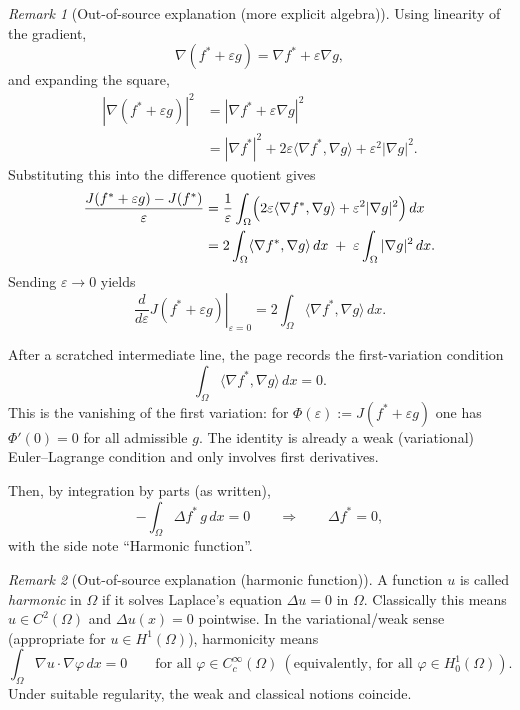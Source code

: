 \documentclass[11pt]{article}
\theoremstyle{definition}
\theoremstyle{remark}
\newtheorem{remark}{Remark}
\begin{document}
\begin{remark}[Out-of-source explanation (more explicit algebra)]
Using linearity of the gradient,
\[
\nabla(f^\ast+\varepsilon g)=\nabla f^\ast+\varepsilon\nabla g,
\]
and expanding the square,
\[
\begin{aligned}
|\nabla(f^\ast+\varepsilon g)|^2
&=|\nabla f^\ast+\varepsilon\nabla g|^2 \\
&=|\nabla f^\ast|^2 + 2\varepsilon\langle \nabla f^\ast,\nabla g\rangle + \varepsilon^2|\nabla g|^2.
\end{aligned}
\]
Substituting this into the difference quotient gives
\[
\begin{aligned}
\frac{J(f^\ast+\varepsilon g)-J(f^\ast)}{\varepsilon}
&=\frac{1}{\varepsilon}\int_\Omega\Bigl(2\varepsilon\langle \nabla f^\ast,\nabla g\rangle + \varepsilon^2|\nabla g|^2\Bigr)\,dx\\
&=2\int_\Omega \langle \nabla f^\ast,\nabla g\rangle\,dx \;+\; \varepsilon\int_\Omega |\nabla g|^2\,dx.
\end{aligned}
\]
Sending $\varepsilon\to 0$ yields
\[
\left.\frac{d}{d\varepsilon}J(f^\ast+\varepsilon g)\right|_{\varepsilon=0}
=2\int_\Omega \langle \nabla f^\ast,\nabla g\rangle\,dx.
\]
\end{remark}

After a scratched intermediate line, the page records the first-variation condition
\[
\int_\Omega \langle \nabla f^\ast,\nabla g\rangle\,dx = 0.
\]
This is the vanishing of the first variation: for $\Phi(\varepsilon):=J(f^\ast+\varepsilon g)$ one has $\Phi'(0)=0$ for all admissible $g$. The identity is already a weak (variational) Euler--Lagrange condition and only involves first derivatives.

Then, by integration by parts (as written),
\[
-\int_\Omega \Delta f^\ast \, g\,dx = 0
\qquad \Rightarrow \qquad
\Delta f^\ast = 0,
\]
with the side note ``Harmonic function''.

\begin{remark}[Out-of-source explanation (harmonic function)]
A function $u$ is called \emph{harmonic} in $\Omega$ if it solves Laplace's equation $\Delta u=0$ in $\Omega$. Classically this means $u\in C^2(\Omega)$ and $\Delta u(x)=0$ pointwise. In the variational/weak sense (appropriate for $u\in H^1(\Omega)$), harmonicity means
\[
\int_\Omega \nabla u\cdot\nabla \varphi\,dx = 0
\qquad \text{for all } \varphi\in C_c^\infty(\Omega)
\ (\text{equivalently, for all } \varphi\in H_0^1(\Omega)).
\]
Under suitable regularity, the weak and classical notions coincide.
\end{remark}
\end{document}
